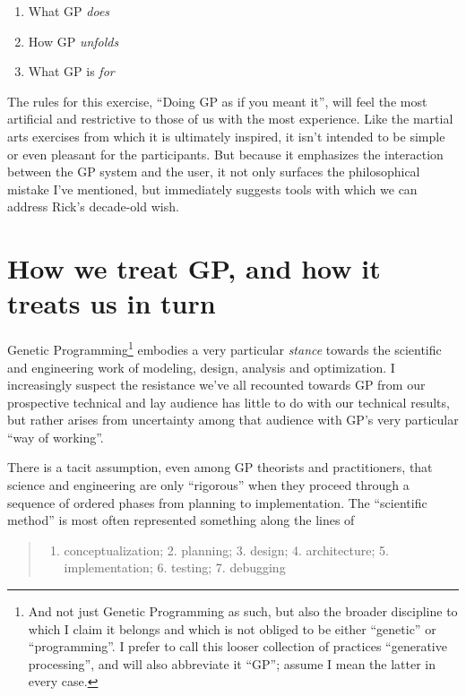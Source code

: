 \begin{enumerate}
\item What GP \emph{does}
\item How GP \emph{unfolds}
\item What GP is \emph{for}
\end{enumerate}

The rules for this exercise, ``Doing GP as if you meant it'', will feel the most artificial and restrictive to those of us with the most experience. Like the martial arts exercises from which it is ultimately inspired, it isn't intended to be simple or even pleasant for the participants. But because it emphasizes the interaction between the GP system and the user, it not only surfaces the philosophical mistake I've mentioned, but immediately suggests tools with which we can address Rick's decade-old wish.

\section{How we treat GP, and how it treats us in turn}\hypertarget{how-we-treat-gp-and-how-it-treats-us-in-turn}{}\label{how-we-treat-gp-and-how-it-treats-us-in-turn}

Genetic Programming\footnote{And not just Genetic Programming as such, but also the broader discipline to which I claim it belongs and which is not obliged to be either ``genetic'' or ``programming''. I prefer to call this looser collection of practices ``generative processing'', and will also abbreviate it ``GP''; assume I mean the latter in every case.} embodies a very particular \emph{stance} towards the scientific and engineering work of modeling, design, analysis and optimization. I increasingly suspect the resistance we've all recounted towards GP from our prospective technical and lay audience has little to do with our technical results, but rather arises from uncertainty among that audience with GP's very particular ``way of working''.

There is a tacit assumption, even among GP theorists and practitioners, that science and engineering are only ``rigorous'' when they proceed through a sequence of ordered phases from planning to implementation. The ``scientific method'' is most often represented something along the lines of

\begin{quote}
\begin{enumerate}
\item conceptualization; 2. planning; 3. design; 4. architecture; 5. implementation; 6. testing; 7. debugging
\end{enumerate}
\end{quote}

